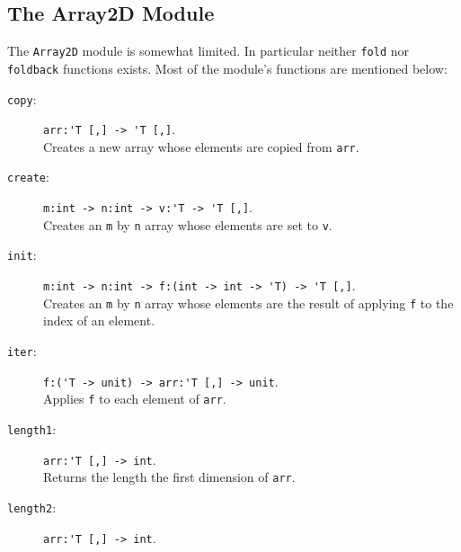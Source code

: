 \documentclass[fsharpNotes.tex]{subfiles}
\begin{document}
\subsection{The Array2D Module}
The \lstinline{Array2D} module is somewhat limited. In particular neither \lstinline{fold} nor \lstinline{foldback} functions exists. Most of the module's functions are mentioned below:
\begin{description}
\item[\texttt{copy}:] \lstinline{arr:'T [,] -> 'T [,]}.~\\
  Creates a new array whose elements are copied from \lstinline{arr}.
\item[\texttt{create}:] \lstinline{m:int -> n:int -> v:'T -> 'T [,]}.~\\
  Creates an \lstinline{m} by \lstinline{n} array whose elements are set to \lstinline{v}.
\item[\texttt{init}:] \lstinline{m:int -> n:int -> f:(int -> int -> 'T) -> 'T [,]}.~\\
  Creates an \lstinline{m} by \lstinline{n} array whose elements are the result of applying \lstinline{f} to the index of an element.
\item[\texttt{iter}:] \lstinline{f:('T -> unit) -> arr:'T [,] -> unit}.~\\
  Applies \lstinline{f} to each element of \lstinline{arr}.
\item[\texttt{length1}:] \lstinline{arr:'T [,] -> int}.~\\
  Returns the length the first dimension of \lstinline{arr}.
\item[\texttt{length2}:] \lstinline{arr:'T [,] -> int}.~\\

\end{description}
\end{document}

